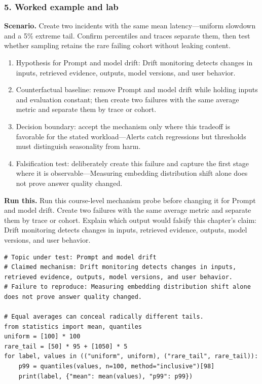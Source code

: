 \subsubsection*{5. Worked example and lab}
\textbf{Scenario.} Create two incidents with the same mean latency—uniform slowdown and a 5\% extreme tail. Confirm percentiles and traces separate them, then test whether sampling retains the rare failing cohort without leaking content.
\begin{enumerate}
\item Hypothesis for Prompt and model drift: Drift monitoring detects changes in inputs, retrieved evidence, outputs, model versions, and user behavior.
\item Counterfactual baseline: remove Prompt and model drift while holding inputs and evaluation constant; then create two failures with the same average metric and separate them by trace or cohort.
\item Decision boundary: accept the mechanism only where this tradeoff is favorable for the stated workload—Alerts catch regressions but thresholds must distinguish seasonality from harm.
\item Falsification test: deliberately create this failure and capture the first stage where it is observable—Measuring embedding distribution shift alone does not prove answer quality changed.
\end{enumerate}
\textbf{Run this.} Run this course-level mechanism probe before changing it for Prompt and model drift. Create two failures with the same average metric and separate them by trace or cohort. Explain which output would falsify this chapter's claim: Drift monitoring detects changes in inputs, retrieved evidence, outputs, model versions, and user behavior.
\begin{Verbatim}[fontsize=\scriptsize]
# Topic under test: Prompt and model drift
# Claimed mechanism: Drift monitoring detects changes in inputs, retrieved evidence, outputs, model versions, and user behavior.
# Failure to reproduce: Measuring embedding distribution shift alone does not prove answer quality changed.

# Equal averages can conceal radically different tails.
from statistics import mean, quantiles
uniform = [100] * 100
rare_tail = [50] * 95 + [1050] * 5
for label, values in (("uniform", uniform), ("rare_tail", rare_tail)):
    p99 = quantiles(values, n=100, method="inclusive")[98]
    print(label, {"mean": mean(values), "p99": p99})
\end{Verbatim}
